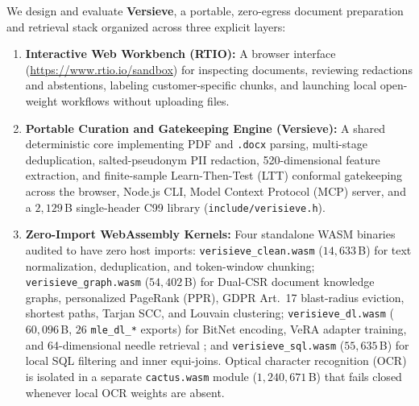\documentclass{article}
\begin{document}
We design and evaluate \textbf{Versieve}, a portable, zero-egress document preparation and retrieval stack organized across three explicit layers:
\begin{enumerate}
    \item \textbf{Interactive Web Workbench (RTIO):} A browser interface (\url{https://www.rtio.io/sandbox}) for inspecting documents, reviewing redactions and abstentions, labeling customer-specific chunks, and launching local open-weight workflows without uploading files.
    \item \textbf{Portable Curation and Gatekeeping Engine (Versieve):} A shared deterministic core implementing PDF and \texttt{.docx} parsing, multi-stage deduplication, salted-pseudonym PII redaction, 520-dimensional feature extraction, and finite-sample Learn-Then-Test (LTT) conformal gatekeeping across the browser, Node.js CLI, Model Context Protocol (MCP) server, and a $2{,}129$\,B single-header C99 library (\texttt{include/verisieve.h}).
    \item \textbf{Zero-Import WebAssembly Kernels:} Four standalone WASM binaries audited to have zero host imports: \texttt{verisieve\_clean.wasm} ($14{,}633$\,B) for text normalization, deduplication, and token-window chunking; \texttt{verisieve\_graph.wasm} ($54{,}402$\,B) for Dual-CSR document knowledge graphs, personalized PageRank (PPR), GDPR Art.~17 blast-radius eviction, shortest paths, Tarjan SCC, and Louvain clustering; \texttt{verisieve\_dl.wasm} ($60{,}096$\,B, $26$ \texttt{mle\_dl\_*} exports) for BitNet encoding, VeRA adapter training, and 64-dimensional needle retrieval \citep{wang2024bitnet,kopiczko2024vera,vaswani2017attention}; and \texttt{verisieve\_sql.wasm} ($55{,}635$\,B) for local SQL filtering and inner equi-joins. Optical character recognition (OCR) is isolated in a separate \texttt{cactus.wasm} module ($1{,}240{,}671$\,B) that fails closed whenever local OCR weights are absent.
\end{enumerate}
\end{document}

